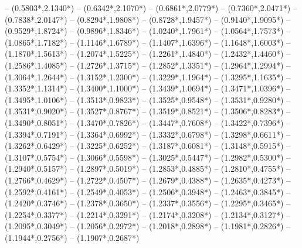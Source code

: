 {	-- ({0.5803*\dx},{2.1340*\dy})
	-- ({0.6342*\dx},{2.1070*\dy})
	-- ({0.6861*\dx},{2.0779*\dy})
	-- ({0.7360*\dx},{2.0471*\dy})
	-- ({0.7838*\dx},{2.0147*\dy})
	-- ({0.8294*\dx},{1.9808*\dy})
	-- ({0.8728*\dx},{1.9457*\dy})
	-- ({0.9140*\dx},{1.9095*\dy})
	-- ({0.9529*\dx},{1.8724*\dy})
	-- ({0.9896*\dx},{1.8346*\dy})
	-- ({1.0240*\dx},{1.7961*\dy})
	-- ({1.0564*\dx},{1.7573*\dy})
	-- ({1.0865*\dx},{1.7182*\dy})
	-- ({1.1146*\dx},{1.6789*\dy})
	-- ({1.1407*\dx},{1.6396*\dy})
	-- ({1.1648*\dx},{1.6003*\dy})
	-- ({1.1870*\dx},{1.5613*\dy})
	-- ({1.2074*\dx},{1.5225*\dy})
	-- ({1.2261*\dx},{1.4840*\dy})
	-- ({1.2432*\dx},{1.4460*\dy})
	-- ({1.2586*\dx},{1.4085*\dy})
	-- ({1.2726*\dx},{1.3715*\dy})
	-- ({1.2852*\dx},{1.3351*\dy})
	-- ({1.2964*\dx},{1.2994*\dy})
	-- ({1.3064*\dx},{1.2644*\dy})
	-- ({1.3152*\dx},{1.2300*\dy})
	-- ({1.3229*\dx},{1.1964*\dy})
	-- ({1.3295*\dx},{1.1635*\dy})
	-- ({1.3352*\dx},{1.1314*\dy})
	-- ({1.3400*\dx},{1.1000*\dy})
	-- ({1.3439*\dx},{1.0694*\dy})
	-- ({1.3471*\dx},{1.0396*\dy})
	-- ({1.3495*\dx},{1.0106*\dy})
	-- ({1.3513*\dx},{0.9823*\dy})
	-- ({1.3525*\dx},{0.9548*\dy})
	-- ({1.3531*\dx},{0.9280*\dy})
	-- ({1.3531*\dx},{0.9020*\dy})
	-- ({1.3527*\dx},{0.8767*\dy})
	-- ({1.3519*\dx},{0.8521*\dy})
	-- ({1.3506*\dx},{0.8283*\dy})
	-- ({1.3490*\dx},{0.8051*\dy})
	-- ({1.3470*\dx},{0.7826*\dy})
	-- ({1.3447*\dx},{0.7608*\dy})
	-- ({1.3422*\dx},{0.7396*\dy})
	-- ({1.3394*\dx},{0.7191*\dy})
	-- ({1.3364*\dx},{0.6992*\dy})
	-- ({1.3332*\dx},{0.6798*\dy})
	-- ({1.3298*\dx},{0.6611*\dy})
	-- ({1.3262*\dx},{0.6429*\dy})
	-- ({1.3225*\dx},{0.6252*\dy})
	-- ({1.3187*\dx},{0.6081*\dy})
	-- ({1.3148*\dx},{0.5915*\dy})
	-- ({1.3107*\dx},{0.5754*\dy})
	-- ({1.3066*\dx},{0.5598*\dy})
	-- ({1.3025*\dx},{0.5447*\dy})
	-- ({1.2982*\dx},{0.5300*\dy})
	-- ({1.2940*\dx},{0.5157*\dy})
	-- ({1.2897*\dx},{0.5019*\dy})
	-- ({1.2853*\dx},{0.4885*\dy})
	-- ({1.2810*\dx},{0.4755*\dy})
	-- ({1.2766*\dx},{0.4629*\dy})
	-- ({1.2722*\dx},{0.4507*\dy})
	-- ({1.2679*\dx},{0.4388*\dy})
	-- ({1.2635*\dx},{0.4273*\dy})
	-- ({1.2592*\dx},{0.4161*\dy})
	-- ({1.2549*\dx},{0.4053*\dy})
	-- ({1.2506*\dx},{0.3948*\dy})
	-- ({1.2463*\dx},{0.3845*\dy})
	-- ({1.2420*\dx},{0.3746*\dy})
	-- ({1.2378*\dx},{0.3650*\dy})
	-- ({1.2337*\dx},{0.3556*\dy})
	-- ({1.2295*\dx},{0.3465*\dy})
	-- ({1.2254*\dx},{0.3377*\dy})
	-- ({1.2214*\dx},{0.3291*\dy})
	-- ({1.2174*\dx},{0.3208*\dy})
	-- ({1.2134*\dx},{0.3127*\dy})
	-- ({1.2095*\dx},{0.3049*\dy})
	-- ({1.2056*\dx},{0.2972*\dy})
	-- ({1.2018*\dx},{0.2898*\dy})
	-- ({1.1981*\dx},{0.2826*\dy})
	-- ({1.1944*\dx},{0.2756*\dy})
	-- ({1.1907*\dx},{0.2687*\dy})
}
